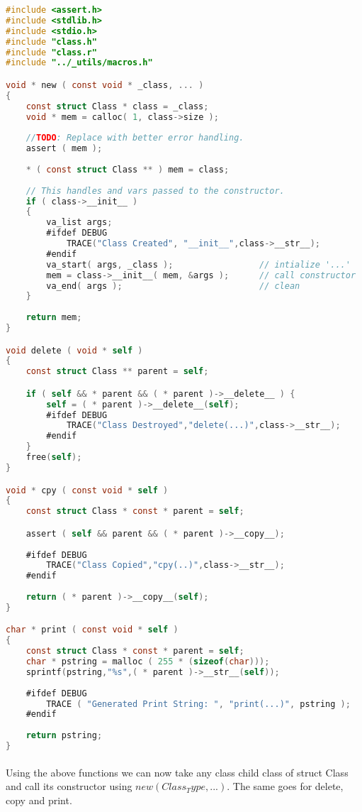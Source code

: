 \documentclass[fancychapters]{report}   	%
\begin{document}
\begin{lstlisting}[language=C,caption={class.c}]
#include <assert.h>
#include <stdlib.h>
#include <stdio.h>
#include "class.h"
#include "class.r"
#include "../_utils/macros.h"

void * new ( const void * _class, ... )
{
    const struct Class * class = _class;
    void * mem = calloc( 1, class->size );
    
    //TODO: Replace with better error handling.
    assert ( mem );
    
    * ( const struct Class ** ) mem = class;
    
    // This handles and vars passed to the constructor.
    if ( class->__init__ )
    {
        va_list args;
        #ifdef DEBUG
            TRACE("Class Created", "__init__",class->__str__);
        #endif
        va_start( args, _class );                 // intialize '...'
	    mem = class->__init__( mem, &args );      // call constructor
        va_end( args );                           // clean
    }
    
    return mem;
}

void delete ( void * self )
{
    const struct Class ** parent = self;

    if ( self && * parent && ( * parent )->__delete__ ) {
        self = ( * parent )->__delete__(self);
        #ifdef DEBUG
            TRACE("Class Destroyed","delete(...)",class->__str__);
        #endif
    } 
    free(self);
}

void * cpy ( const void * self )
{
    const struct Class * const * parent = self;

    assert ( self && parent && ( * parent )->__copy__);
    
    #ifdef DEBUG
        TRACE("Class Copied","cpy(..)",class->__str__);
    #endif
    
    return ( * parent )->__copy__(self);
}

char * print ( const void * self )
{
    const struct Class * const * parent = self;
    char * pstring = malloc ( 255 * (sizeof(char)));
    sprintf(pstring,"%s",( * parent )->__str__(self));
    
    #ifdef DEBUG
        TRACE ( "Generated Print String: ", "print(...)", pstring );
    #endif
    
    return pstring;
}
\end{lstlisting} 
\paragraph{}Using the above functions we can now take any class child class of struct Class and call its constructor using $ new(Class_Type,...) $.  The same goes for delete, copy and print.  
\end{document}
